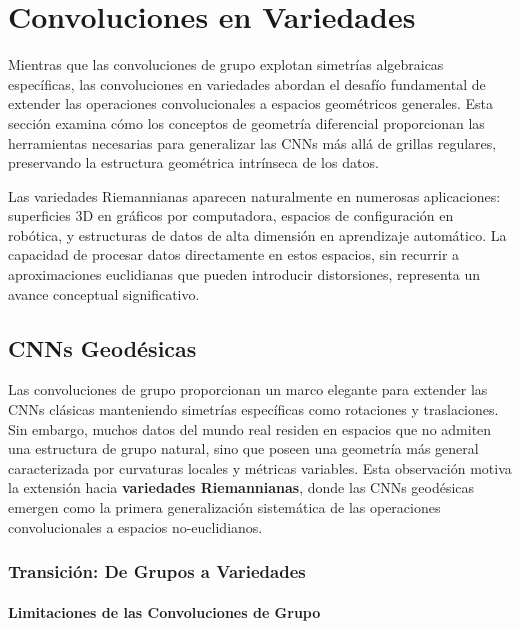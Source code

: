 \section{Convoluciones en Variedades}\label{sec:manifold_cnns}

Mientras que las convoluciones de grupo explotan simetrías algebraicas específicas, las convoluciones en variedades abordan el desafío fundamental de extender las operaciones convolucionales a espacios geométricos generales. Esta sección examina cómo los conceptos de geometría diferencial proporcionan las herramientas necesarias para generalizar las \glspl{CNN} más allá de grillas regulares, preservando la estructura geométrica intrínseca de los datos.

Las variedades Riemannianas aparecen naturalmente en numerosas aplicaciones: superficies 3D en gráficos por computadora, espacios de configuración en robótica, y estructuras de datos de alta dimensión en aprendizaje automático. La capacidad de procesar datos directamente en estos espacios, sin recurrir a aproximaciones euclidianas que pueden introducir distorsiones, representa un avance conceptual significativo.

\subsection{CNNs Geodésicas}\label{subsec:geodesic_cnns}

Las convoluciones de grupo proporcionan un marco elegante para extender las \glspl{CNN} clásicas manteniendo simetrías específicas como rotaciones y traslaciones. Sin embargo, muchos datos del mundo real residen en espacios que no admiten una estructura de grupo natural, sino que poseen una geometría más general caracterizada por curvaturas locales y métricas variables. Esta observación motiva la extensión hacia \textbf{variedades Riemannianas}, donde las CNNs geodésicas emergen como la primera generalización sistemática de las operaciones convolucionales a espacios no-euclidianos.

\subsubsection{Transición: De Grupos a Variedades}

\paragraph{Limitaciones de las Convoluciones de Grupo}

